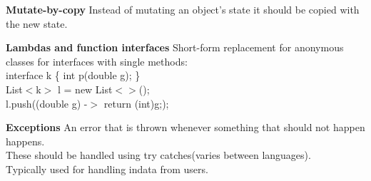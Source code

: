 \documentclass{article}
\begin{document}
\begin{Parallel}[v]{0.49\textwidth}{0.49\textwidth}
{        \textbf{Mutate-by-copy}\newline
        Instead of mutating an object's state it should be copied with the new state.

        \textbf{Lambdas and function interfaces}\newline
        Short-form replacement for anonymous classes for interfaces with single methods:\\
        interface k \{
        int p(double g);
        \}\\
        List$<$k$>$ l = new List$<>$();\\
        l.push((double g) -$>$ {return (int)g;});

        \textbf{Exceptions}\newline
        An error that is thrown whenever something that should not happen happens.\\
        These should be handled using try catches(varies between languages). \\
        Typically used for handling indata from users.
    }
    \ParallelPar
\end{Parallel}
\end{document}
